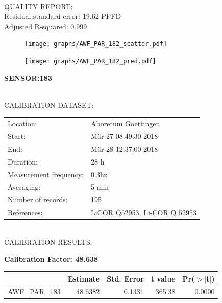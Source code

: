 \documentclass[oneside]{report}
\begin{document}
\hrulefill\\
QUALITY REPORT:\\
Residual standard error: 19.62 PPFD\\
Adjusted R-squared: 0.999



\begin{figure}[H]
  \centering
  \texttt{[image: graphs/AWF\_PAR\_182\_scatter.pdf]}
\end{figure}




\begin{figure}[H]
  \centering
  \texttt{[image: graphs/AWF\_PAR\_182\_pred.pdf]}
\end{figure}

\pagebreak


\begin{center}
\large{\textbf{SENSOR:183}}\\
\end{center}

\hrulefill\\
CALIBRATION DATASET:\\
\begin{table}[h!]
  \centering
  \label{tab:table1}
  \begin{tabular}{ll}
    Location: & Aboretum Goettingen\\ 
    
    
    Start:  & Mär 27 08:49:30 2018 \\
    End:   & Mär 28 12:37:00 2018\\ 
    Duration: & 28 h\\
    Measurement frequency: & 0.3hz\\
    Averaging:  &5 min\\
    Number of records: & 195 \\
    References: & LiCOR Q52953, Li-COR Q 52953 \\
  \end{tabular}
\end{table}

\hrulefill\\
CALIBRATION RESULTS:\\


\begin{center}
\textbf{\large{Calibration Factor: 48.638}}\\
\end{center}
\begin{table}[ht]
\centering
\begin{tabular}{rrrrr}
  \hline
 & Estimate & Std. Error & t value & Pr($>$$|$t$|$) \\ 
  \hline
AWF\_PAR\_183 & 48.6382 & 0.1331 & 365.38 & 0.0000 \\ 
   \hline
\end{tabular}
\end{table}
\end{document}
